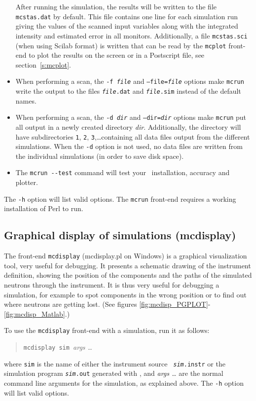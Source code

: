 \begin{itemize}
After running the simulation, the results will be written to the file
\verb+mcstas.dat+ by default. This file contains one line for each simulation
run giving the values of the scanned input variables along with the integrated
intensity and estimated error in all monitors. Additionally, a file
\verb+mcstas.sci+ (when using Scilab format) is written that can be read by the
\verb+mcplot+ front-end to plot the results on the screen or in a Postscript
file, see section~\ref{s:mcplot}. 
\item When performing a scan, the \texttt{-f {\it file}} and
  \texttt{--file={\it file}} options make \verb+mcrun+ write the output
  to the files \texttt{{\it file\/}.dat} and \texttt{{\it file\/}.sim}
  instead of the default names.
\item When performing a scan, the \texttt{-d {\it dir}} and
  \texttt{--dir={\it dir}} options make \verb+mcrun+ put all output in a
  newly created directory \textit{dir}. Additionally, the directory will
  have subdirectories \verb+1+, \verb+2+, \verb+3+,\ldots containing all
  data files output from the different simulations. When the \verb+-d+
  option is not used, no data files are written from the individual
  simulations (in order to save disk space).
\item The \verb+mcrun --test+ command will test your \MCS\ installation,
  accuracy and plotter. 
\end{itemize}

The \verb+-h+ option will list valid options. The \verb+mcrun+ front-end
requires a working installation of Perl to run.


\subsection{Graphical display of simulations (mcdisplay)}
\label{s:mcdisplay}

The front-end \verb+mcdisplay+ (mcdisplay.pl on Windows) is a graphical
visualization tool, very useful for debugging.  It presents a schematic drawing
of the instrument definition, showing the position of the components and the
paths of the simulated neutrons through the instrument. It is thus very useful
for debugging a simulation, for example to spot components in the wrong position
or to find out where neutrons are getting lost.  (See figures
\ref{fig:mcdisp_PGPLOT}-\ref{fig:mcdisp_Matlab}.)

To use the \verb+mcdisplay+ front-end with a simulation, run it as
follows:
\begin{quote}
  \verb+mcdisplay sim +{\it args \ldots}
\end{quote}
where \verb+sim+ is the name of either the instrument source \texttt{{\it
    sim}.instr} or the simulation program \texttt{{\it sim}.out} generated with
\MCS, and \textit{args \ldots} are the normal command line arguments for the
simulation, as explained above. The \verb+-h+ option will list valid options.

